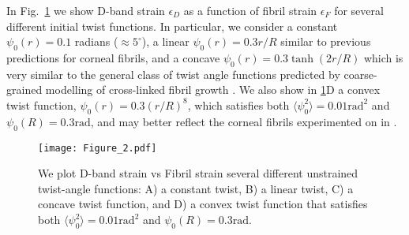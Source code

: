 

In Fig.~\ref{fig:dbandvsfibrilstrain} we show D-band strain $\epsilon_D$ as a function of fibril strain $\epsilon_F$ for several different initial twist functions. In particular, we consider a constant $\psi_0(r) = 0.1$ radians ($\approx 5^\circ$), a linear $\psi_0(r) = 0.3 r/R$ similar to previous predictions for corneal fibrils, and a concave $\psi_0(r) = 0.3\tanh(2r/R)$ which is very similar to the general class of twist angle functions predicted by coarse-grained modelling of cross-linked fibril growth \cite{Leighton:2021}. We also show in \ref{fig:dbandvsfibrilstrain}D a convex twist function, $\psi_0(r) = 0.3 \left(r/R\right)^8$, which satisfies both $\langle\psi_0^2\rangle=0.01\text{rad}^2$ and $\psi_0(R)=0.3\text{rad}$, and may better reflect the corneal fibrils experimented on in \cite{Bell:2018}.

\begin{figure}[h] 
\centering
  \texttt{[image: Figure\_2.pdf]}
  \caption{We plot D-band strain vs Fibril strain several different unstrained twist-angle functions: A) a constant twist, B) a linear twist, C) a concave twist function, and D) a convex twist function that satisfies both $\langle\psi_0^2\rangle=0.01\text{rad}^2$ and $\psi_0(R)=0.3\text{rad}$.}
  \label{fig:dbandvsfibrilstrain}
\end{figure}



